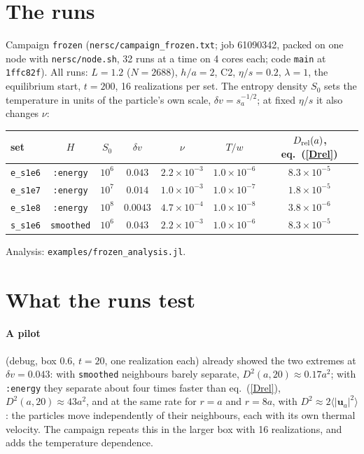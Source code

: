 \documentclass[11pt,aps,preprint,nofootinbib,superscriptaddress,tightenlines]{revtex4-2}
\def\Eq#1{eq.~(\ref{#1})}
\newcommand{\avg}[1]{\langle #1\rangle}
\let\oldparagraph\paragraph
\renewcommand{\paragraph}{\par\bigskip\oldparagraph}
\begin{document}
\section{The runs}
\label{sec:runs}

Campaign \texttt{frozen} (\texttt{nersc/campaign\_frozen.txt}; job 61090342, packed on one
node with \texttt{nersc/node.sh}, 32 runs at a time on 4 cores each; code \texttt{main} at
\texttt{1ffc82f}).  All runs: $L=1.2$ ($N=2688$), $h/a=2$, C2, $\eta/s=0.2$, $\lambda=1$, the
equilibrium start, $t=200$, 16 realizations per set.  The entropy density $S_0$ sets the
temperature in units of the particle's own scale, $\delta v=s_a^{-1/2}$; at fixed $\eta/s$ it also
changes $\nu$:
\begin{center}
\begin{tabular}{lcccccc}
\hline
set & $H$ & $S_0$ & $\delta v$ & $\nu$ & $T/w$ & $D_{\rm rel}(a)$, \Eq{Drel} \\ \hline
\texttt{e\_s1e6} & \texttt{:energy} & $10^6$ & $0.043$ & $2.2\times10^{-3}$ & $1.0\times10^{-6}$ & $8.3\times10^{-5}$ \\
\texttt{e\_s1e7} & \texttt{:energy} & $10^7$ & $0.014$ & $1.0\times10^{-3}$ & $1.0\times10^{-7}$ & $1.8\times10^{-5}$ \\
\texttt{e\_s1e8} & \texttt{:energy} & $10^8$ & $0.0043$ & $4.7\times10^{-4}$ & $1.0\times10^{-8}$ & $3.8\times10^{-6}$ \\
\texttt{s\_s1e6} & \texttt{smoothed} & $10^6$ & $0.043$ & $2.2\times10^{-3}$ & $1.0\times10^{-6}$ & $8.3\times10^{-5}$ \\
\hline
\end{tabular}
\end{center}
Analysis: \texttt{examples/frozen\_analysis.jl}.

\section{What the runs test}
\label{sec:tests}

\paragraph{A pilot} (debug, box $0.6$, $t=20$, one realization each) already showed the two
extremes at $\delta v=0.043$: with \texttt{smoothed} neighbours barely separate, $D^2(a,20)\approx
0.17a^2$; with \texttt{:energy} they separate about four times faster than \Eq{Drel},
$D^2(a,20)\approx43a^2$, and at the same rate for $r=a$ and $r=8a$, with $D^2\approx2\avg{|\bm
u_a|^2}$: the particles move independently of their neighbours, each with its own thermal
velocity.  The campaign repeats this in the larger box with 16 realizations, and adds the
temperature dependence.
\end{document}
